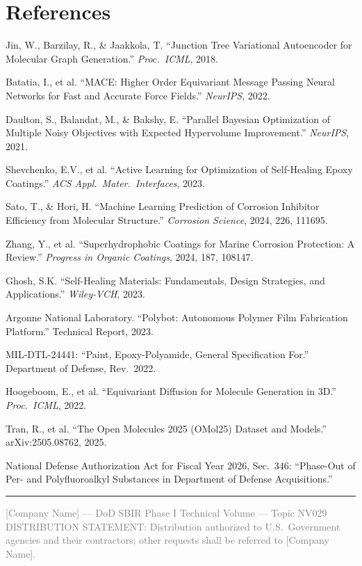 \documentclass[11pt,letterpaper]{article}
\begin{document}
\section*{References}
\label{sec:references}

\begin{enumerate}[nosep, label={[\arabic*]}]
  \item Jin, W., Barzilay, R., \& Jaakkola, T. ``Junction Tree Variational
    Autoencoder for Molecular Graph Generation.'' \textit{Proc.\ ICML}, 2018.
  \item Batatia, I., et al. ``MACE: Higher Order Equivariant Message Passing
    Neural Networks for Fast and Accurate Force Fields.'' \textit{NeurIPS}, 2022.
  \item Daulton, S., Balandat, M., \& Bakshy, E. ``Parallel Bayesian
    Optimization of Multiple Noisy Objectives with Expected Hypervolume
    Improvement.'' \textit{NeurIPS}, 2021.
  \item Shevchenko, E.V., et al. ``Active Learning for Optimization of
    Self-Healing Epoxy Coatings.'' \textit{ACS Appl.\ Mater.\ Interfaces},
    2023.
  \item Sato, T., \& Hori, H. ``Machine Learning Prediction of Corrosion
    Inhibitor Efficiency from Molecular Structure.'' \textit{Corrosion Science},
    2024, 226, 111695.
  \item Zhang, Y., et al. ``Superhydrophobic Coatings for Marine Corrosion
    Protection: A Review.'' \textit{Progress in Organic Coatings}, 2024, 187,
    108147.
  \item Ghosh, S.K. ``Self-Healing Materials: Fundamentals, Design Strategies,
    and Applications.'' \textit{Wiley-VCH}, 2023.
  \item Argonne National Laboratory. ``Polybot: Autonomous Polymer Film
    Fabrication Platform.'' Technical Report, 2023.
  \item MIL-DTL-24441: ``Paint, Epoxy-Polyamide, General Specification For.''
    Department of Defense, Rev.\ 2022.
  \item Hoogeboom, E., et al. ``Equivariant Diffusion for Molecule Generation
    in 3D.'' \textit{Proc.\ ICML}, 2022.
  \item Tran, R., et al. ``The Open Molecules 2025 (OMol25) Dataset and
    Models.'' arXiv:2505.08762, 2025.
  \item National Defense Authorization Act for Fiscal Year 2026, Sec.\ 346:
    ``Phase-Out of Per- and Polyfluoroalkyl Substances in Department of Defense
    Acquisitions.''
\end{enumerate}

\vspace{1cm}
\noindent\textcolor{navyblue}{\rule{\textwidth}{1.5pt}}

\begin{center}
\small\textcolor{gray}{
  [Company Name] --- DoD SBIR Phase I Technical Volume --- Topic NV029\\
  DISTRIBUTION STATEMENT: Distribution authorized to U.S.\ Government
  agencies and their contractors; other requests shall be referred to
  [Company Name].
}
\end{center}
\end{document}
